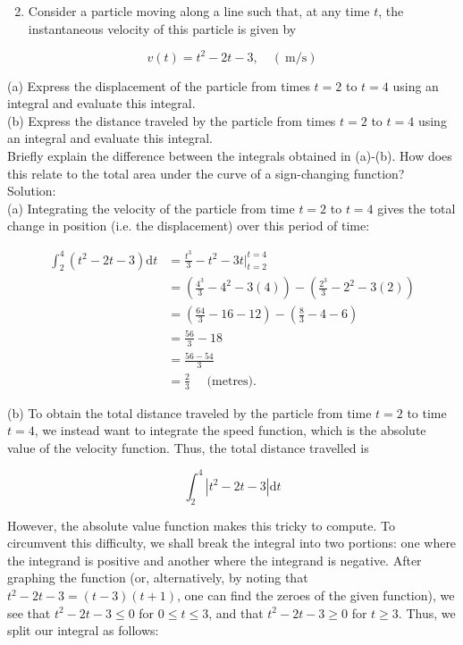 \documentclass[10pt]{article}
\begin{document}
\begin{enumerate}
  \setcounter{enumi}{1}
  \item Consider a particle moving along a line such that, at any time $t$, the instantaneous velocity of this particle is given by
\end{enumerate}

$$
v(t)=t^{2}-2 t-3, \quad(\mathrm{~m} / \mathrm{s})
$$

(a) Express the displacement of the particle from times $t=2$ to $t=4$ using an integral and evaluate this integral.\\
(b) Express the distance traveled by the particle from times $t=2$ to $t=4$ using an integral and evaluate this integral.\\
Briefly explain the difference between the integrals obtained in (a)-(b). How does this relate to the total area under the curve of a sign-changing function?\\
Solution:\\
(a) Integrating the velocity of the particle from time $t=2$ to $t=4$ gives the total change in position (i.e. the displacement) over this period of time:

$$
\begin{aligned}
\int_{2}^{4}\left(t^{2}-2 t-3\right) \mathrm{d} t & =\frac{t^{3}}{3}-t^{2}-\left.3 t\right|_{t=2} ^{t=4} \\
& =\left(\frac{4^{3}}{3}-4^{2}-3(4)\right)-\left(\frac{2^{3}}{3}-2^{2}-3(2)\right) \\
& =\left(\frac{64}{3}-16-12\right)-\left(\frac{8}{3}-4-6\right) \\
& =\frac{56}{3}-18 \\
& =\frac{56-54}{3} \\
& =\frac{2}{3} \quad \text { (metres). }
\end{aligned}
$$

(b) To obtain the total distance traveled by the particle from time $t=2$ to time $t=4$, we instead want to integrate the speed function, which is the absolute value of the velocity function. Thus, the total distance travelled is

$$
\int_{2}^{4}\left|t^{2}-2 t-3\right| \mathrm{d} t
$$

However, the absolute value function makes this tricky to compute. To circumvent this difficulty, we shall break the integral into two portions: one where the integrand is positive and another where the integrand is negative. After graphing the function (or, alternatively, by noting that $t^{2}-2 t-3=(t-3)(t+1)$, one can find the zeroes of the given function), we see that $t^{2}-2 t-3 \leq 0$ for $0 \leq t \leq 3$, and that $t^{2}-2 t-3 \geq 0$ for $t \geq 3$. Thus, we split our integral as follows:
\end{document}
